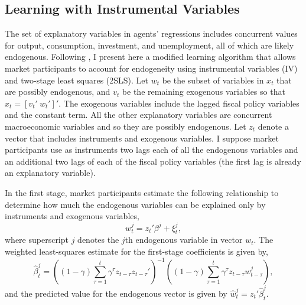 \documentclass[11pt]{article}
\newcommand{\beq}{\begin{equation}}
\newcommand{\eeq}{\end{equation}}
\newcommand{\citee}[1]{\citet{#1}}
\begin{document}
\subsection{Learning with Instrumental Variables}
The set of explanatory variables in agents' regressions includes concurrent values for output, consumption, investment, and unemployment, all of which are likely endogenous.  Following \citee{herromurray}, I present here a modified learning algorithm that allows market participants to account for endogeneity using instrumental variables (IV) and two-stage least squares (2SLS).  Let $w_t$ be the subset of variables in $x_t$ that are possibly endogenous, and $v_t$ be the remaining exogenous variables so that $x_t = [v_t'~ w_t']'$.  The exogenous variables include the lagged fiscal policy variables and the constant term.  All the other explanatory variables are concurrent macroeconomic variables and so they are possibly endogenous.  Let $z_t$ denote a vector that includes instruments and exogenous variables.  I suppose market participants use as instruments two lags each of all the endogenous variables and an additional two lags of each of the fiscal policy variables (the first lag is already an explanatory variable).

In the first stage, market participants estimate the following relationship to determine how much the endogenous variables can be explained only by instruments and exogenous variables,
\beq w^j_{t} = z_t ' \beta^j + \xi^j_{t}, \eeq
where superscript $j$ denotes the $j$th endogenous variable in vector $w_t$.  The weighted least-squares estimate for the first-stage coefficients is given by,
\beq \label{eq:iv1} \hat{\beta}^j_t = \left( (1-\gamma)  \sum_{\tau=1}^{t} \gamma^{\tau} z_{t-\tau} z_{t-\tau}' \right)^{-1}  \left( (1-\gamma)  \sum_{\tau=1}^{t} \gamma^{\tau} z_{t-\tau}  w^j_{t-\tau} \right), \eeq
and the predicted value for the endogenous vector is given by $\hat{w}^j_{t} = z_{t}' \hat{\beta}^j_t.$
\end{document}
